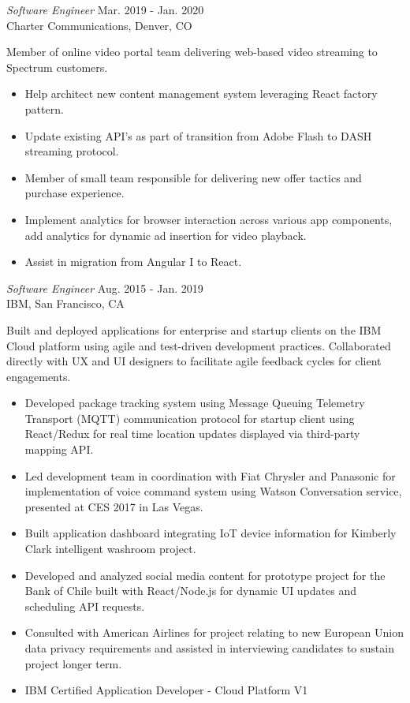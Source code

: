 \documentclass{res}
\begin{document}
\begin{resume}
{\sl Software Engineer} \hfill        Mar. 2019 - Jan. 2020 \\
Charter Communications, Denver, CO
\begin{changemargin}{0.4cm}{0cm} 
Member of online video portal team delivering web-based video streaming to Spectrum customers.
\end{changemargin} 
   \begin{itemize} \itemsep -2pt %
      \item Help architect new content management system leveraging React factory pattern.
      \item Update existing API's as part of transition from Adobe Flash to DASH streaming protocol.
      \item Member of small team responsible for delivering new offer tactics and purchase experience.
      \item Implement analytics for browser interaction across various app components, add analytics for dynamic ad insertion for video playback.
   \item Assist in migration from Angular I to React.
   \end{itemize}

{\sl Software Engineer} \hfill        Aug. 2015 - Jan. 2019 \\
IBM, San Francisco, CA
\begin{changemargin}{0.4cm}{0cm} 
Built and deployed applications for enterprise and startup clients on the IBM Cloud platform using agile and test-driven development practices. Collaborated directly with UX and UI designers to facilitate agile feedback cycles for client engagements.  
\end{changemargin} 
   \begin{itemize} \itemsep -2pt %
   \item Developed package tracking system using Message Queuing Telemetry Transport (MQTT) communication protocol for startup client using React/Redux for real time location updates displayed via third-party mapping API.
   \item Led development team in coordination with Fiat Chrysler and Panasonic for implementation of voice command system using Watson Conversation service, presented at CES 2017 in Las Vegas. 
   \item Built application dashboard integrating IoT device information for Kimberly Clark intelligent washroom project.
   \item Developed and analyzed social media content for prototype project for the Bank of Chile built with React/Node.js for dynamic UI updates and scheduling API requests.
   \item Consulted with American Airlines for project relating to new European Union data privacy requirements and assisted in interviewing candidates to sustain project longer term.
    \item IBM Certified Application Developer - Cloud Platform V1
   \end{itemize}


\end{resume}
\end{document}
